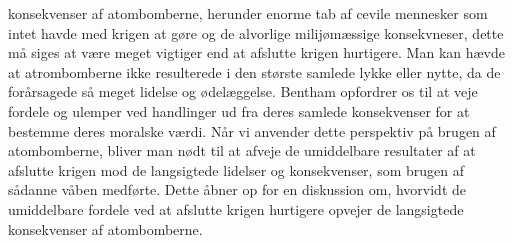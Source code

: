 konsekvenser af atombomberne, herunder enorme tab af cevile mennesker som intet havde med krigen at gøre og de alvorlige milijømæssige konsekvneser, dette må siges at være meget vigtiger end at afslutte krigen hurtigere. Man kan hævde at atrombomberne ikke resulterede i den største samlede lykke eller nytte, da de forårsagede så meget lidelse og ødelæggelse. Bentham opfordrer os til at veje fordele og ulemper ved handlinger ud fra deres samlede konsekvenser for at bestemme deres moralske værdi. Når vi anvender dette perspektiv på brugen af atombomberne, bliver man nødt til at afveje de umiddelbare resultater af at afslutte krigen mod de langsigtede lidelser og konsekvenser, som brugen af sådanne våben medførte. Dette åbner op for en diskussion om, hvorvidt de umiddelbare fordele ved at afslutte krigen hurtigere opvejer de langsigtede konsekvenser af atombomberne. \\


\newpage
